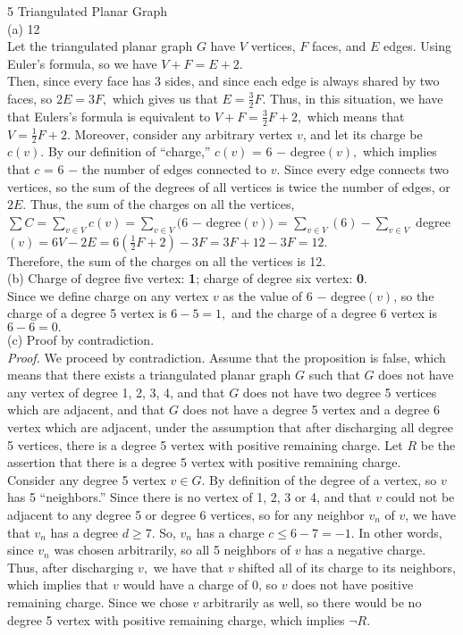 \documentclass{article}
\begin{document}
{\Large 5 Triangulated Planar Graph} \\[.5cm]
(a) 12 \\[.3cm]
\indent Let the triangulated planar graph $G$ have $V$ vertices, $F$ faces, and $E$ edges. Using Euler's formula, so we have $V + F = E + 2.$\\[.1cm]
\indent Then, since every face has 3 sides, and since each edge is always shared by two faces, so $2E = 3F,$ which gives us that $E = \frac{3}{2}F.$ Thus, in this situation, we have that Eulers's formula is equivalent to $V + F = \frac{3}{2}F + 2,$ which means that $V = \frac{1}{2}F + 2.$ Moreover, consider any arbitrary vertex $v$, and let its charge be $c(v).$ By our definition of ``charge,'' $c(v)$ = 6 $ - $ degree$(v),$ which implies that $c$ = 6 $-$ the number of edges connected to $v.$ Since every edge connects two vertices, so the sum of the degrees of all vertices is twice the number of edges, or $2E.$ Thus, the sum of the charges on all the vertices, $\sum C = \sum\limits_{v\in V} c(v) = \sum\limits_{v\in V} (6$ $-$ degree$(v))$ = $\sum\limits_{v\in V} (6) -\sum\limits_{v\in V}$ degree$(v) = 6V - 2E = 6(\frac{1}{2}F + 2) - 3F = 3F + 12 - 3F = 12.$\\[.1cm]
\indent Therefore, the sum of the charges on all the vertices is 12. \\[.5cm]
(b) Charge of degree five vertex: \textbf{1}; charge of degree six vertex: \textbf{0}.\\[.3cm]
\indent Since we define charge on any vertex $v$ as the value of 6 $-$ degree$(v)$, so the charge of a degree 5 vertex is $6 - 5 = 1,$ and the charge of a degree 6 vertex is $6 - 6 = 0.$ \\[.5cm]
(c) Proof by contradiction.\\[.1cm]
\indent\textit{Proof.} We proceed by contradiction. Assume that the proposition is false, which means that there exists a triangulated planar graph $G$ such that $G$ does not have any vertex of degree 1, 2, 3, 4, and that $G$ does not have two degree 5 vertices which are adjacent, and that $G$ does not have a degree 5 vertex and a degree 6 vertex which are adjacent, under the assumption that after discharging all degree 5 vertices, there is a degree 5 vertex with positive remaining charge. Let $R$ be the assertion that there is a degree 5 vertex with positive remaining charge.\\[.1cm]
\indent Consider any degree 5 vertex $v\in G.$ By definition of the degree of a vertex, so $v$ has 5 ``neighbors.'' Since there is no vertex of 1, 2, 3 or 4, and that $v$ could not be adjacent to any degree 5 or degree 6 vertices, so for any neighbor $v_n$ of $v$, we have that $v_n$ has a degree $d\geq7.$ So, $v_n$ has a charge $c\leq 6-7 = -1.$ In other words, since $v_n$ was chosen arbitrarily, so all 5 neighbors of $v$ has a negative charge. Thus, after discharging $v,$ we have that $v$ shifted all of its charge to its neighbors, which implies that $v$ would have a charge of 0, so $v$ does not have positive remaining charge. Since we chose $v$ arbitrarily as well, so there would be no degree 5 vertex with positive remaining charge, which implies $\neg R.$\\[.1cm]
\end{document}

